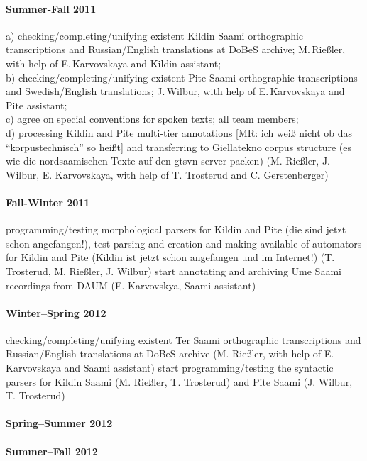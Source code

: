 \documentclass[a4paper,12pt]{article}
\begin{document}
{{{{\paragraph{Summer-Fall 2011}
a) checking/completing/unifying existent Kildin Saami orthographic transcriptions and Russian/English translations at DoBeS archive; 
M.\,Rießler, with help of E.\,Karvovskaya and Kildin assistant;\\
b) checking/completing/unifying existent Pite Saami orthographic transcriptions and Swedish/English translations;
J.\,Wilbur, with help of E.\,Karvovskaya and Pite assistant;\\%
c) agree on special conventions for spoken texts; all team members;\\
d) processing Kildin and Pite multi-tier annotations [MR: ich weiß nicht ob das “korpustechnisch” so heißt] and transferring to Giellatekno corpus structure (es wie die nordsaamischen Texte auf den gtsvn server packen)
(M. Rießler, J. Wilbur, E. Karvovskaya, with help of T. Trosterud and C. Gerstenberger)

\paragraph{Fall-Winter 2011}
programming/testing morphological parsers for Kildin and Pite (die sind jetzt schon angefangen!), test parsing and creation and making available of automators for Kildin and Pite (Kildin ist jetzt schon angefangen und im Internet!)
(T. Trosterud, M. Rießler, J. Wilbur)
start annotating and archiving Ume Saami recordings from DAUM (E. Karvovskya, Saami assistant)

\paragraph{Winter–Spring 2012}
checking/completing/unifying existent Ter Saami orthographic transcriptions and Russian/English translations at DoBeS archive 
(M. Rießler, with help of E. Karvovskaya and Saami assistant)
start programming/testing the syntactic parsers for Kildin Saami (M. Rießler, T. Trosterud) and Pite Saami (J. Wilbur, T. Trosterud)

\paragraph{Spring–Summer 2012}

\paragraph{Summer–Fall 2012}

}}}}
\end{document}
